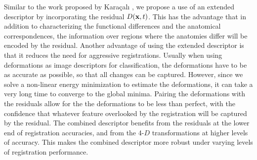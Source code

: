 Similar to the work proposed by Kara\c{c}al{\i} \cite{residual}, we propose a use of an extended descriptor by incorporating the residual $D(\mathbf{x}, t)$. This has the advantage that in addition to characterizing the functional differences and the anatomical correspondences, the information over regions where the anatomies differ will be encoded by the residual. Another advantage of using the extended descriptor is that it reduces the need for aggressive registrations. Usually when using deformations as image descriptors for classification, the deformations have to be as accurate as possible, so that all changes can be captured. However, since we solve a non-linear energy minimization to estimate the deformations, it can take a very long time to converge to the global minima. Pairing the deformations with the residuals allow for the the deformations to be less than perfect, with the confidence that whatever feature overlooked by the registration will be captured by the residual. The combined descriptor benefits from the residuals at the lower end of registration accuracies, and from the 4-$D$ transformations at higher levels of accuracy. This makes the combined descriptor more robust under varying levels of registration performance.



